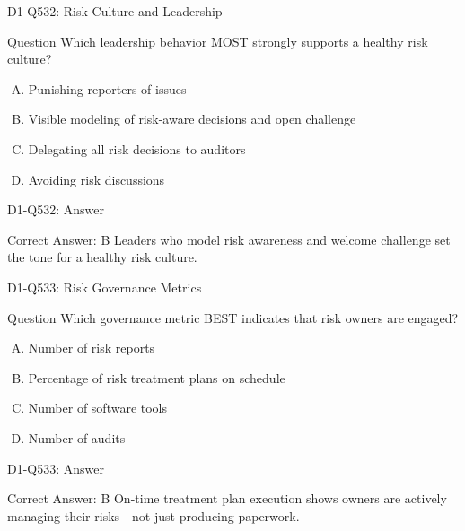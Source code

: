 \documentclass{beamer}
\begin{document}
\begin{frame}{D1-Q532: Risk Culture and Leadership}
	\begin{block}{Question}
		Which leadership behavior MOST strongly supports a healthy risk culture?
	\end{block}
	\begin{enumerate}[(A)]
		\item Punishing reporters of issues
		\item Visible modeling of risk-aware decisions and open challenge
		\item Delegating all risk decisions to auditors
		\item Avoiding risk discussions
	\end{enumerate}
\end{frame}
\begin{frame}{D1-Q532: Answer}
	\begin{block}{Correct Answer: B}
		Leaders who model risk awareness and welcome challenge set the tone for a healthy risk culture.
	\end{block}
\end{frame}

\begin{frame}{D1-Q533: Risk Governance Metrics}
	\begin{block}{Question}
		Which governance metric BEST indicates that risk owners are engaged?
	\end{block}
	\begin{enumerate}[(A)]
		\item Number of risk reports
		\item Percentage of risk treatment plans on schedule
		\item Number of software tools
		\item Number of audits
	\end{enumerate}
\end{frame}
\begin{frame}{D1-Q533: Answer}
	\begin{block}{Correct Answer: B}
		On-time treatment plan execution shows owners are actively managing their risks—not just producing paperwork.
	\end{block}
\end{frame}
\end{document}
